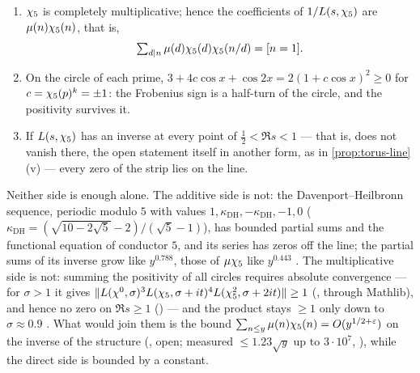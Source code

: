 \begin{proposition}\label{prop:multiplicative-side}
\begin{enumerate}[label=\textup{(\roman*)}]
  \item $\chi_5$ is completely multiplicative; hence the coefficients of $1/L(s,\chi_5)$
    are $\mu(n)\chi_5(n)$, that is,
    \[\textstyle\sum_{d\mid n}\mu(d)\chi_5(d)\chi_5(n/d)=[n=1].\]
  \item On the circle of each prime, $3+4c\cos x+\cos2x=2(1+c\cos x)^2\ge0$ for $c=\chi_5(p)^k=\pm1$:
    the Frobenius sign is a half-turn of the circle, and the positivity survives it.
  \item If $L(s,\chi_5)$ has an inverse at every point of $\tfrac12<\Re s<1$ --- that is, does not vanish
    there, the open statement itself in another form, as in \cref{prop:torus-line}(v) --- every zero of the
    strip lies on the line.
\end{enumerate}

\end{proposition}

Neither side is enough alone.  The additive side is not: the Davenport--Heilbronn
sequence, periodic modulo $5$ with values $1,\kappa_{\mathrm{DH}},-\kappa_{\mathrm{DH}},-1,0$
($\kappa_{\mathrm{DH}}=(\sqrt{10-2\sqrt5}-2)/(\sqrt5-1)$), has bounded partial sums and the functional
equation of conductor $5$, and its series has zeros off the line; the partial sums of
its inverse grow like $y^{0.788}$, those of $\mu\chi_5$ like $y^{0.443}$ .
The multiplicative side is not: summing the positivity of all circles requires absolute
convergence --- for $\sigma>1$ it gives $\|L(\chi^0,\sigma)^3L(\chi_5,\sigma+it)^4L(\chi_5^2,\sigma+2it)\|\ge1$
(, through Mathlib), and hence no zero on
$\Re s\ge1$ () --- and the product stays $\ge1$ only down to
$\sigma\approx0.9$ .  What would join them is the bound
$\sum_{n\le y}\mu(n)\chi_5(n)=O(y^{1/2+\varepsilon})$ on the inverse of the structure
(, open; measured $\le1.23\sqrt y$ up to $3\cdot10^7$,
), while the direct side is bounded by a constant.

